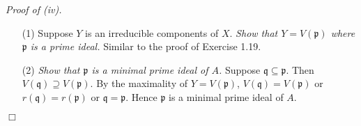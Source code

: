\documentclass{article}
\begin{document}
\emph{Proof of (iv).}
\begin{enumerate}
\item[(1)]
  Suppose $Y$ is an irreducible components of $X$.
  \emph{Show that $Y = V(\mathfrak{p})$ where $\mathfrak{p}$ is a prime ideal.}
  Similar to the proof of Exercise 1.19.

\item[(2)]
  \emph{Show that $\mathfrak{p}$ is a minimal prime ideal of $A$.}
  Suppose $\mathfrak{q} \subseteq \mathfrak{p}$.
  Then $V(\mathfrak{q}) \supseteq V(\mathfrak{p})$.
  By the maximality of $Y = V(\mathfrak{p})$,
  $V(\mathfrak{q}) = V(\mathfrak{p})$
  or $r(\mathfrak{q}) = r(\mathfrak{p})$
  or $\mathfrak{q} = \mathfrak{p}$.
  Hence $\mathfrak{p}$ is a minimal prime ideal of $A$.
\end{enumerate}
$\Box$ \\\\



\end{document}

